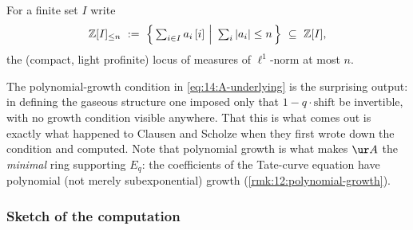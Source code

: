 \begin{notation}
\label{not:14:bounded}
For a finite set $I$ write
\begin{equation*}
\mathbb{Z}[I]_{\le n}\ :=\ \Bigl\{\,\textstyle\sum_{i\in I} a_i\,[i]\ \Big|\ \sum_i|a_i|\le n\,\Bigr\}\ \subseteq\ \mathbb{Z}[I],
\end{equation*}
the (compact, light profinite) locus of measures of $\ell^1$-norm at most $n$.
\end{notation}

\begin{remark}
\label{rmk:14:surprise}
The polynomial-growth condition in \eqref{eq:14:A-underlying} is the surprising
output: in defining the gaseous structure one imposed only that $1-q\cdot\mathrm{shift}$
be invertible, with no growth condition visible anywhere. That this is what comes
out is exactly what happened to Clausen and Scholze when they first wrote down the
condition and computed. Note that polynomial growth is what makes $\ur A$ the
\emph{minimal} ring supporting $E_q$: the coefficients of the Tate-curve equation
have polynomial (not merely subexponential) growth (\cref{rmk:12:polynomial-growth}).
\end{remark}

\subsubsection*{Sketch of the computation}

